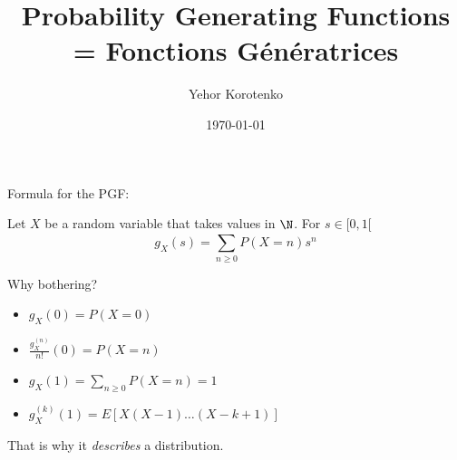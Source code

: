 \documentclass[12pt]{article}
\title{Probability Generating Functions = Fonctions Génératrices}
\author{Yehor Korotenko}
\date{\today}
\begin{document}
\maketitle

Formula for the PGF:

Let $X$ be a random variable that takes values in  $\N$. For $s \in [0, 1[$ 
$$g_X(s) = \sum_{n \ge 0}^{} P(X = n)s^n$$

Why bothering?

\begin{itemize}
    \item $g_X(0) = P(X = 0)$
    \item $\frac{g_X^{(n)}}{n!}(0) = P(X = n)$
    \item $g_X(1) = \sum_{n \ge 0}^{} P(X = n) = 1$
    \item $g_X^{(k)}(1) = E[X(X-1)\ldots(X-k+1)]$
\end{itemize}

That is why it \textit{describes} a distribution.
\end{document}
